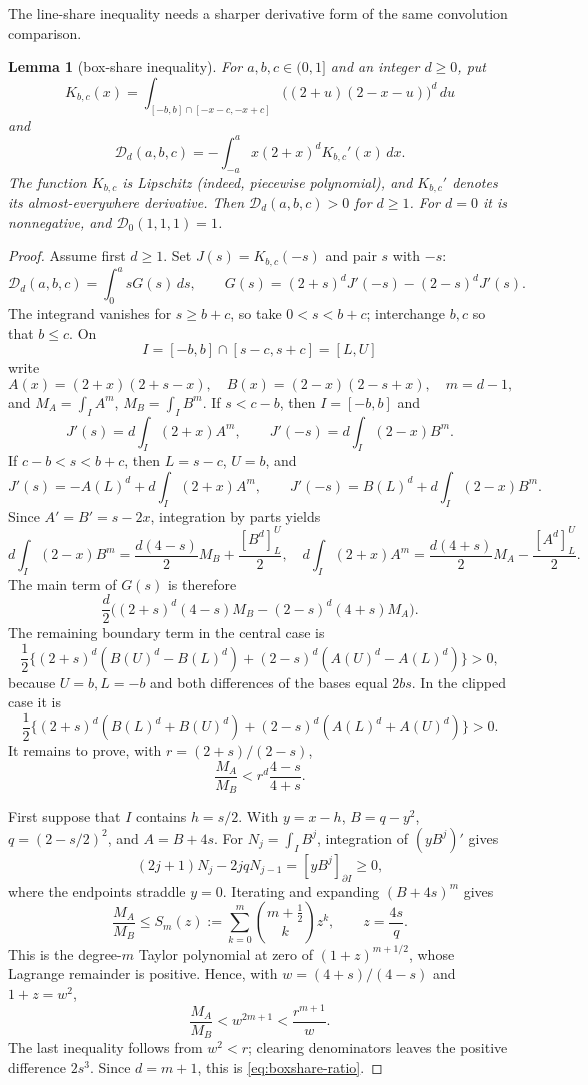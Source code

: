 \documentclass[11pt]{amsart}
\newtheorem{lemma}[theorem]{Lemma}
\theoremstyle{definition}
\theoremstyle{remark}
\begin{document}
The line-share inequality needs a sharper derivative form of the same
convolution comparison.

\begin{lemma}[box-share inequality]\label{lem:boxshare}
For $a,b,c\in(0,1]$ and an integer $d\ge0$, put
\[
 K_{b,c}(x)=\int_{[-b,b]\cap[-x-c,-x+c]}
       \bigl((2+u)(2-x-u)\bigr)^d\,du
\]
and
\[
 \mathcal D_d(a,b,c)=-\int_{-a}^a x(2+x)^dK_{b,c}'(x)\,dx.
\]
The function $K_{b,c}$ is Lipschitz (indeed, piecewise polynomial), and
$K_{b,c}'$ denotes its almost-everywhere derivative.
Then $\mathcal D_d(a,b,c)>0$ for $d\ge1$. For $d=0$ it is
nonnegative, and $\mathcal D_0(1,1,1)=1$.
\end{lemma}

\begin{proof}
Assume first $d\ge1$. Set $J(s)=K_{b,c}(-s)$ and pair $s$ with $-s$:
\begin{equation}\label{eq:boxshare-pair}
 \mathcal D_d(a,b,c)=\int_0^a sG(s)\,ds,\qquad
 G(s)=(2+s)^dJ'(-s)-(2-s)^dJ'(s).
\end{equation}
The integrand vanishes for $s\ge b+c$, so take $0<s<b+c$; interchange
$b,c$ so that $b\le c$. On
\[
 I=[-b,b]\cap[s-c,s+c]=[L,U]
\]
write
\[
 A(x)=(2+x)(2+s-x),\quad B(x)=(2-x)(2-s+x),\quad m=d-1,
\]
and $M_A=\int_I A^m$, $M_B=\int_I B^m$. If $s<c-b$, then
$I=[-b,b]$ and
\[
 J'(s)=d\int_I(2+x)A^m,\qquad
 J'(-s)=d\int_I(2-x)B^m.
\]
If $c-b<s<b+c$, then $L=s-c$, $U=b$, and
\[
 J'(s)=-A(L)^d+d\int_I(2+x)A^m,\qquad
 J'(-s)=B(L)^d+d\int_I(2-x)B^m.
\]
Since $A'=B'=s-2x$, integration by parts yields
\[
 d\int_I(2-x)B^m=\frac{d(4-s)}2M_B+\frac{[B^d]_L^U}{2},
 \quad
 d\int_I(2+x)A^m=\frac{d(4+s)}2M_A-\frac{[A^d]_L^U}{2}.
\]
The main term of $G(s)$ is therefore
\begin{equation}\label{eq:boxshare-main}
 \frac d2\bigl((2+s)^d(4-s)M_B-(2-s)^d(4+s)M_A\bigr).
\end{equation}
The remaining boundary term in the central case is
\[
 \frac12\{(2+s)^d(B(U)^d-B(L)^d)
 +(2-s)^d(A(U)^d-A(L)^d)\}>0,
\]
because $U=b,L=-b$ and both differences of the bases equal $2bs$. In
the clipped case it is
\[
 \frac12\{(2+s)^d(B(L)^d+B(U)^d)
 +(2-s)^d(A(L)^d+A(U)^d)\}>0.
\]
It remains to prove, with $r=(2+s)/(2-s)$,
\begin{equation}\label{eq:boxshare-ratio}
 \frac{M_A}{M_B}<r^d\frac{4-s}{4+s}.
\end{equation}

First suppose that $I$ contains $h=s/2$. With $y=x-h$,
$B=q-y^2$, $q=(2-s/2)^2$, and $A=B+4s$. For
$N_j=\int_I B^j$, integration of $(yB^j)'$ gives
\[
 (2j+1)N_j-2jqN_{j-1}=[yB^j]_{\partial I}\ge0,
\]
where the endpoints straddle $y=0$. Iterating and expanding $(B+4s)^m$
gives
\[
 \frac{M_A}{M_B}\le
 S_m(z):=\sum_{k=0}^m\binom{m+\tfrac12}{k}z^k,
 \qquad z=\frac{4s}{q}.
\]
This is the degree-$m$ Taylor polynomial at zero of
$(1+z)^{m+1/2}$, whose Lagrange remainder is positive. Hence, with
$w=(4+s)/(4-s)$ and $1+z=w^2$,
\[
 \frac{M_A}{M_B}<w^{2m+1}<\frac{r^{m+1}}{w}.
\]
The last inequality follows from $w^2<r$; clearing denominators leaves
the positive difference $2s^3$. Since $d=m+1$, this is
\eqref{eq:boxshare-ratio}.


\end{proof}
\end{document}
